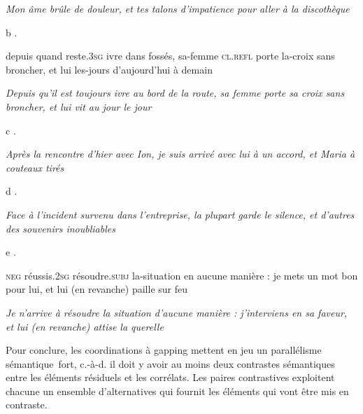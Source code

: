 {\itshape
Mon âme brûle de douleur, et tes talons d'impatience pour aller à la discothèque}

  b   \textstyleapplestylespan{}  . 

    depuis quand reste\textsc{.3sg} ivre dans fossés, sa-femme \textsc{cl.refl} porte la-croix sans broncher, et lui les-jours d'aujourd'hui à demain

{\itshape
Depuis qu'il est toujours ivre au bord de la route, sa femme porte sa croix sans broncher, et lui vit au jour le jour} 

  c   \textstyleapplestylespan{}  . 

{\itshape
Après la rencontre d'hier avec Ion, je suis arrivé avec lui à un accord, et Maria à couteaux tirés}

  d   \textstyleapplestylespan{}  . 

{\itshape
Face à l'incident survenu dans l'entreprise, la plupart garde le silence, et d'autres des souvenirs inoubliables}

  e   \textstyleapplestylespan{}  . 

    \textsc{neg} réussis.\textsc{2sg} résoudre.\textsc{subj} la-situation en aucune manière : je mets un mot bon pour lui, et lui (en revanche) paille sur feu

{\itshape
Je n'arrive à résoudre la situation d'aucune manière : j'interviens en sa faveur, et lui (en revanche) attise la querelle } 

Pour conclure, les coordinations à gapping mettent en jeu un parallélisme sémantique~fort, c.-à-d. il doit y avoir au moins deux contrastes sémantiques entre les éléments résiduels et les corrélats. Les paires contrastives exploitent chacune un ensemble d'alternatives qui fournit les éléments qui vont être mis en contraste. 

